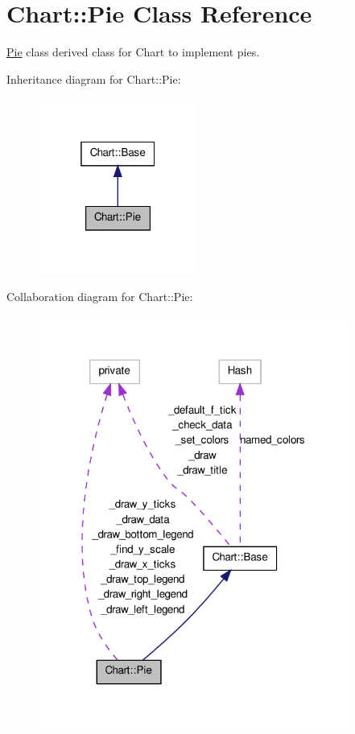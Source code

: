 \hypertarget{classChart_1_1Pie}{
\section{Chart::Pie Class Reference}
\label{classChart_1_1Pie}
}


\hyperlink{classChart_1_1Pie}{Pie} class derived class for Chart to implement pies.  




Inheritance diagram for Chart::Pie:\nopagebreak
\begin{figure}[H]
\begin{center}
\leavevmode
\includegraphics[width=148pt]{classChart_1_1Pie__inherit__graph}
\end{center}
\end{figure}


Collaboration diagram for Chart::Pie:\nopagebreak
\begin{figure}[H]
\begin{center}
\leavevmode
\includegraphics[width=289pt]{classChart_1_1Pie__coll__graph}
\end{center}
\end{figure}
